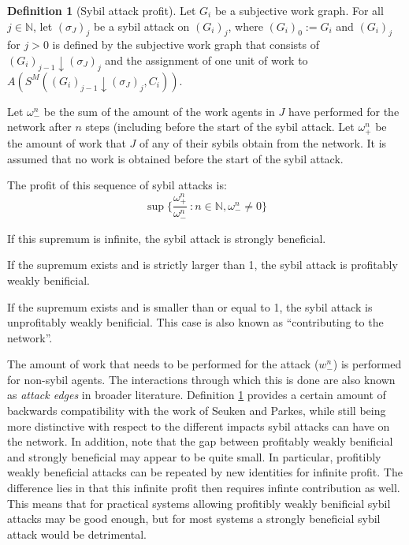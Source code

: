 \documentclass[a4paper,11pt]{book}
\newcommand{\bb}{\mathbb}
\theoremstyle{definition}
\newtheorem{definition}{Definition}
\begin{document}
\begin{definition}[Sybil attack profit]
    Let $G_i$ be a subjective work graph. For all $j \in \bb{N}$, let $(\sigma_J)_j$ be a sybil attack
    on $(G_i)_j$, where $(G_i)_0 := G_i$ and $(G_i)_j$ for $j > 0$ is defined by the subjective
    work graph that consists of $(G_i)_{j-1} \downarrow (\sigma_J)_j$ and the assignment of one unit of work to 
    $A(S^M( (G_i)_{j-1} \downarrow (\sigma_J)_j, C_i))$.

    Let $\omega^n_-$ be the sum of the amount of the work agents in $J$ have performed for
    the network after $n$ steps (including before the start of the sybil attack.
    Let $\omega^n_+$ be the amount of work that $J$ of any of their
    sybils obtain from the network. It is assumed that no work is obtained before the start of the
    sybil attack.

    The profit of this sequence of sybil attacks is:
    \begin{equation*}
        \sup \{\frac{\omega^n_+}{\omega^n_-}\ : n \in \bb{N}, \omega^n_- \neq 0\}
    \end{equation*}

    If this supremum is infinite, the sybil attack is strongly beneficial.

    If the supremum exists and is strictly larger than 1, the sybil attack is 
    profitably weakly benificial.

    If the supremum exists and is smaller than or equal to 1, the sybil attack
    is unprofitably weakly benificial. This case is also known as ``contributing to the network''.
    \label{def:sybil_profit}
\end{definition}

The amount of work that needs to be performed for the attack ($w^n_-$) is performed for non-sybil
agents. The interactions through which this is done are also known as \emph{attack edges} in broader
literature.
Definition \ref{def:sybil_profit} provides a certain amount of backwards compatibility with the work
of Seuken and Parkes, while still being more distinctive with respect to the different impacts
sybil attacks can have on the network. In addition, note that the gap between profitably weakly
benificial and strongly beneficial may appear to be quite small. In particular, profitibly weakly beneficial
attacks can be repeated by new identities for infinite profit. The difference lies in that
this infinite profit then requires infinte contribution as well. This means that for practical systems
allowing profitibly weakly benificial sybil attacks may be good enough, but for most systems a 
strongly beneficial sybil attack would be detrimental.
\end{document}
